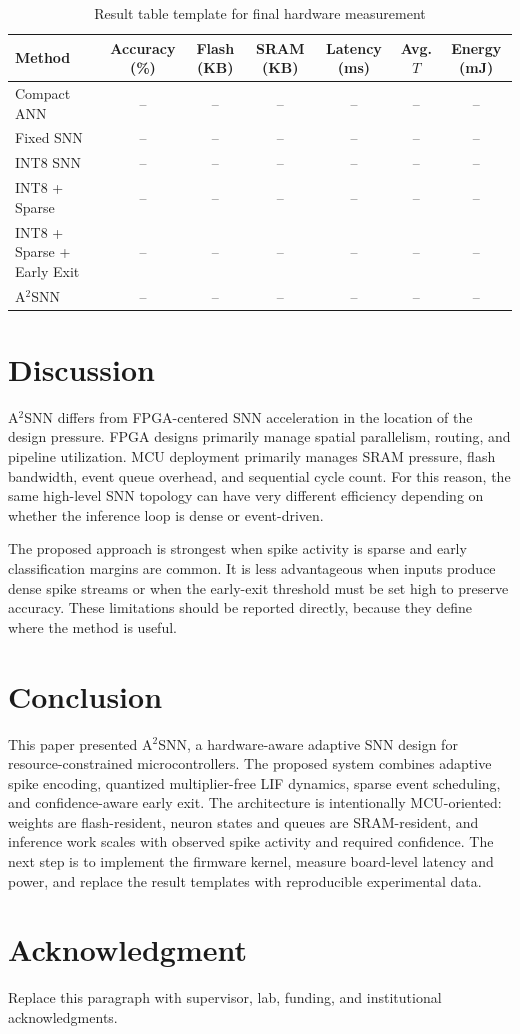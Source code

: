 \documentclass[journal]{IEEEtran}
\newcommand{\modelname}{A$^2$SNN}
\begin{document}
\begin{table}[t]
\centering
\caption{Result table template for final hardware measurement}
\label{tab:result_template}
\begin{tabular}{lcccccc}
\toprule
Method & Accuracy (\%) & Flash (KB) & SRAM (KB) & Latency (ms) & Avg. $T$ & Energy (mJ) \\
\midrule
Compact ANN & -- & -- & -- & -- & -- & -- \\
Fixed SNN & -- & -- & -- & -- & -- & -- \\
INT8 SNN & -- & -- & -- & -- & -- & -- \\
INT8 + Sparse & -- & -- & -- & -- & -- & -- \\
INT8 + Sparse + Early Exit & -- & -- & -- & -- & -- & -- \\
\modelname{} & -- & -- & -- & -- & -- & -- \\
\bottomrule
\end{tabular}
\end{table}

\section{Discussion}
\modelname{} differs from FPGA-centered SNN acceleration in the location of the design pressure. FPGA designs primarily manage spatial parallelism, routing, and pipeline utilization. MCU deployment primarily manages SRAM pressure, flash bandwidth, event queue overhead, and sequential cycle count. For this reason, the same high-level SNN topology can have very different efficiency depending on whether the inference loop is dense or event-driven.

The proposed approach is strongest when spike activity is sparse and early classification margins are common. It is less advantageous when inputs produce dense spike streams or when the early-exit threshold must be set high to preserve accuracy. These limitations should be reported directly, because they define where the method is useful.

\section{Conclusion}
This paper presented \modelname, a hardware-aware adaptive SNN design for resource-constrained microcontrollers. The proposed system combines adaptive spike encoding, quantized multiplier-free LIF dynamics, sparse event scheduling, and confidence-aware early exit. The architecture is intentionally MCU-oriented: weights are flash-resident, neuron states and queues are SRAM-resident, and inference work scales with observed spike activity and required confidence. The next step is to implement the firmware kernel, measure board-level latency and power, and replace the result templates with reproducible experimental data.

\section*{Acknowledgment}
Replace this paragraph with supervisor, lab, funding, and institutional acknowledgments.



\end{document}

